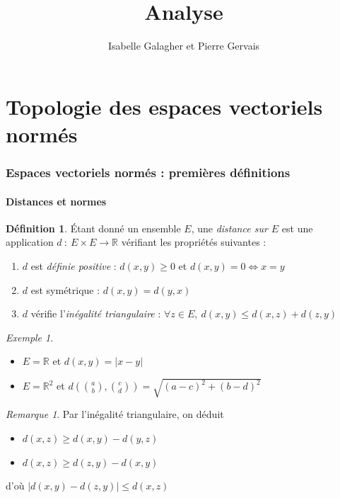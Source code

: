 \documentclass[]{article}
\title{Analyse}
\author{Isabelle Galagher et Pierre Gervais}
\theoremstyle{remark}
\newtheorem{myrem}{Remarque}
\newtheorem{myexmpl}{Exemple}
\theoremstyle{definition}
\newtheorem{mydef}{Définition}
\begin{document}
\maketitle

\tableofcontents

\part{Topologie des espaces vectoriels normés}

\section{Espaces vectoriels normés : premières définitions}

\subsection{Distances et normes}

\begin{mydef}
	Étant donné un ensemble $E$, une \textit{distance sur $E$} est une application $d~: ~ E \times E \longrightarrow \mathbb{R}$ vérifiant les propriétés suivantes :
	\begin{enumerate}
		\item $d$ est \textit{définie positive} : $d(x,y) \geqslant 0$ et $d(x,y) = 0 \Leftrightarrow x=y$
		\item $d$ est symétrique : $d(x,y)=d(y,x)$
		\item $d$ vérifie l'\textit{inégalité triangulaire} : $\forall z \in E, ~ d(x,y) \leqslant d(x,z) + d(z, y)$
	\end{enumerate}
\end{mydef}

\begin{myexmpl}
	\leavevmode
	\begin{itemize}
		\item $E=\mathbb{R}$ et $d(x, y) = |x-y|$
		\item $E=\mathbb{R}^2$ et $d\left(\binom{a}{b},\binom{c}{d}\right)=\sqrt{(a-c)^2+(b-d)^2}$
	\end{itemize}
\end{myexmpl}

\begin{myrem}
	Par l'inégalité triangulaire, on déduit
	\begin{itemize}
		\item $d(x,z) \geqslant d(x, y) - d(y, z)$
		\item $d(x, z) \geqslant d(z, y) - d(x, y)$
	\end{itemize}
	d'où $|d(x, y) - d(z, y)| \leqslant d(x, z)$
\end{myrem}
\end{document}
